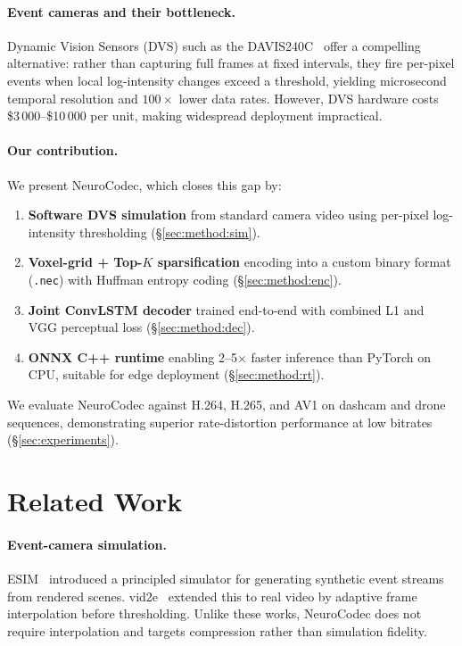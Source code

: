 \documentclass[10pt,twocolumn,letterpaper]{article}
\begin{document}
\paragraph{Event cameras and their bottleneck.}
Dynamic Vision Sensors (DVS) such as the DAVIS240C~\cite{brandli2014240}
offer a compelling alternative: rather than capturing full frames at fixed
intervals, they fire per-pixel events when local log-intensity changes exceed a
threshold, yielding microsecond temporal resolution and $100\times$ lower
data rates.
However, DVS hardware costs \$3\,000--\$10\,000 per unit, making widespread
deployment impractical.

\paragraph{Our contribution.}
We present NeuroCodec, which closes this gap by:
\begin{enumerate}
  \item \textbf{Software DVS simulation} from standard camera video using
        per-pixel log-intensity thresholding (§\ref{sec:method:sim}).
  \item \textbf{Voxel-grid + Top-$K$ sparsification} encoding into a custom
        binary format (\texttt{.nec}) with Huffman entropy coding
        (§\ref{sec:method:enc}).
  \item \textbf{Joint ConvLSTM decoder} trained end-to-end with combined L1
        and VGG perceptual loss (§\ref{sec:method:dec}).
  \item \textbf{ONNX C++ runtime} enabling 2--5$\times$ faster inference than
        PyTorch on CPU, suitable for edge deployment (§\ref{sec:method:rt}).
\end{enumerate}

We evaluate NeuroCodec against H.264, H.265, and AV1 on dashcam and drone
sequences, demonstrating superior rate-distortion performance at low bitrates
(§\ref{sec:experiments}).

\section{Related Work}
\label{sec:related}

\paragraph{Event-camera simulation.}
ESIM~\cite{rebecq2018esim} introduced a principled simulator for generating
synthetic event streams from rendered scenes.
vid2e~\cite{gehrig2020vid2e} extended this to real video by adaptive frame
interpolation before thresholding.
Unlike these works, NeuroCodec does not require interpolation and targets
compression rather than simulation fidelity.
\end{document}
